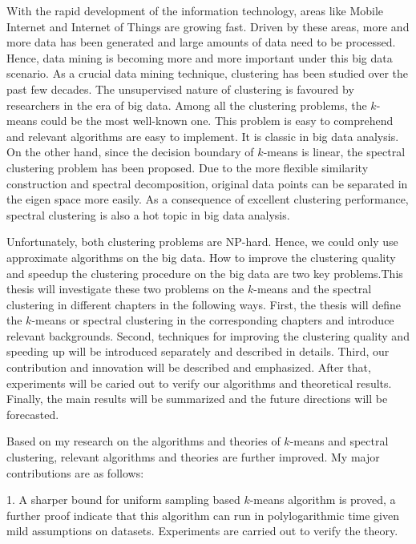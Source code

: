 
\begin{englishabstract}
	With the rapid development of the information technology, areas like Mobile Internet and Internet of Things are
growing fast. Driven by these areas, more and more data has been generated and large amounts of data need to be processed.
Hence, data mining is becoming more and more important under this big data scenario. As a crucial data mining technique,
clustering has been studied over the past few decades. The unsupervised nature of clustering is favoured by researchers in the era of big data. Among all the clustering problems, the $k$-means could be the most well-known one. This problem is easy to comprehend and relevant algorithms are easy to implement. It is classic in big data analysis. On the other hand, since the decision boundary of $k$-means is linear, the spectral clustering problem has been proposed. Due to the more flexible similarity construction and spectral decomposition, original data points can be separated in the eigen space more easily. As a consequence of excellent clustering performance, spectral clustering is also a hot topic in big data analysis.
	
Unfortunately, both clustering problems are NP-hard. Hence, we could only use approximate algorithms on the big data. How to improve the clustering quality and speedup the clustering procedure on the big data are two key problems.This thesis will investigate these two problems on the $k$-means and the spectral clustering in different chapters in the following ways. First, the thesis will define the $k$-means or spectral clustering in the corresponding chapters and introduce relevant backgrounds. Second, techniques for improving the clustering quality and speeding up will be introduced separately and described in details. Third, our contribution and innovation will be described and emphasized. After that, experiments will be caried out to verify our algorithms and theoretical results. Finally, the main results will be summarized and the future directions will be forecasted.

Based on my research on the algorithms and theories of $k$-means and spectral clustering, relevant algorithms and theories are further improved. My major contributions are as follows:

1. A sharper bound for uniform sampling based $k$-means algorithm is proved, a further proof indicate that this algorithm can run in polylogarithmic time given mild assumptions on datasets. Experiments are carried out to verify the theory.


\end{englishabstract}
